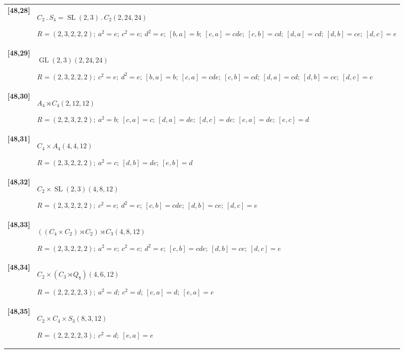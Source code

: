 \documentclass[UTF8,fontset=fandol,11pt,a4paper]{ctexart}
\begin{document}
\begin{longtable}{@{}p{17mm}>{\raggedright\arraybackslash}p{141mm}@{}}
\textbf{[48,28]} & $C_{2}\mathbin{.} S_{4} = \operatorname{SL}(2,3)\mathbin{.} C_{2}$\quad $(2,24,24)$\par\(R=(2,3,2,2,2);\allowbreak\ a^{2}=e;\allowbreak\ c^{2}=e;\allowbreak\ d^{2}=e;\allowbreak\ [b,a]=b;\allowbreak\ [c,a]=cde;\allowbreak\ [c,b]=cd;\allowbreak\ [d,a]=cd;\allowbreak\ [d,b]=ce;\allowbreak\ [d,c]=e\)\\[3pt]

\textbf{[48,29]} & $\operatorname{GL}(2,3)$\quad $(2,24,24)$\par\(R=(2,3,2,2,2);\allowbreak\ c^{2}=e;\allowbreak\ d^{2}=e;\allowbreak\ [b,a]=b;\allowbreak\ [c,a]=cde;\allowbreak\ [c,b]=cd;\allowbreak\ [d,a]=cd;\allowbreak\ [d,b]=ce;\allowbreak\ [d,c]=e\)\\[3pt]

\textbf{[48,30]} & $A_{4}\rtimes C_{4}$\quad $(2,12,12)$\par\(R=(2,2,3,2,2);\allowbreak\ a^{2}=b;\allowbreak\ [c,a]=c;\allowbreak\ [d,a]=de;\allowbreak\ [d,c]=de;\allowbreak\ [e,a]=de;\allowbreak\ [e,c]=d\)\\[3pt]

\textbf{[48,31]} & $C_{4}\times A_{4}$\quad $(4,4,12)$\par\(R=(2,3,2,2,2);\allowbreak\ a^{2}=c;\allowbreak\ [d,b]=de;\allowbreak\ [e,b]=d\)\\[3pt]

\textbf{[48,32]} & $C_{2}\times \operatorname{SL}(2,3)$\quad $(4,8,12)$\par\(R=(2,3,2,2,2);\allowbreak\ c^{2}=e;\allowbreak\ d^{2}=e;\allowbreak\ [c,b]=cde;\allowbreak\ [d,b]=ce;\allowbreak\ [d,c]=e\)\\[3pt]

\textbf{[48,33]} & $((C_{4}\times C_{2})\rtimes C_{2})\rtimes C_{3}$\quad $(4,8,12)$\par\(R=(2,3,2,2,2);\allowbreak\ a^{2}=e;\allowbreak\ c^{2}=e;\allowbreak\ d^{2}=e;\allowbreak\ [c,b]=cde;\allowbreak\ [d,b]=ce;\allowbreak\ [d,c]=e\)\\[3pt]

\textbf{[48,34]} & $C_{2}\times (C_{3}\rtimes Q_{8})$\quad $(4,6,12)$\par\(R=(2,2,2,2,3);\allowbreak\ a^{2}=d;\allowbreak\ c^{2}=d;\allowbreak\ [c,a]=d;\allowbreak\ [e,a]=e\)\\[3pt]

\textbf{[48,35]} & $C_{2}\times C_{4}\times S_{3}$\quad $(8,3,12)$\par\(R=(2,2,2,2,3);\allowbreak\ c^{2}=d;\allowbreak\ [e,a]=e\)\\[3pt]


\end{longtable}
\end{document}
